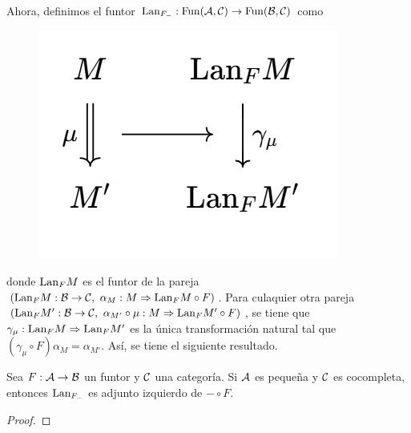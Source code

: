 Ahora, definimos el funtor ${\mathrm{Lan}}_{F_{-}}:{\mathrm{Fun}}({\mathcal A},{\mathcal C})\to{\mathrm{Fun}}({\mathcal B},{\mathcal C})$
como
    \begin{figure}[H]
        \centering
        \includegraphics[width=0.25\linewidth]{img/diagram1-4-8.png}
    \end{figure}

donde ${\mathrm{Lan}}_F M$ es el funtor de la pareja $({\mathrm{Lan}}_FM:{\mathcal B}\to{\mathcal C},\text{ }\alpha_M: M\Rightarrow {\mathrm{Lan}}_FM\circ F)$. Para culaquier otra pareja $({\mathrm{Lan}}_F M':{\mathcal B}\to{\mathcal C},\text{ }\alpha_{M'}\circ\mu:M\Rightarrow {\mathrm{Lan}}_F M'\circ F)$, se tiene que $\gamma_\mu:{\mathrm{Lan}}_F M\Rightarrow {\mathrm{Lan}}_F M'$ es la única transformación natural tal que $(\gamma_\mu\circ F)\alpha_M=\alpha_{M'}$. Así, se tiene el siguiente resultado. 
\begin{prop}
    Sea $F:{\mathcal A}\to{\mathcal B}$ un funtor y ${\mathcal C}$ una categoría. Si ${\mathcal A}$ es pequeña y ${\mathcal C}$ es cocompleta, entonces ${\mathrm{Lan}}_{F_{-}}$ es adjunto izquierdo de $-\circ F$.
\end{prop}
\begin{proof}
\end{proof}
